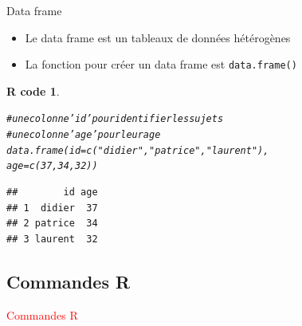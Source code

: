 \documentclass[11pt]{beamer}\usepackage[]{graphicx}\usepackage[]{color}
\makeatletter
\newcommand{\hlnum}[1]{\textcolor[rgb]{0.063,0.58,0.627}{#1}}%
\newcommand{\hlstr}[1]{\textcolor[rgb]{0.063,0.58,0.627}{#1}}%
\newcommand{\hlcom}[1]{\textcolor[rgb]{0.588,0.588,0.588}{#1}}%
\newcommand{\hlstd}[1]{\textcolor[rgb]{0.196,0.196,0.196}{#1}}%
\newcommand{\hlkwc}[1]{\textcolor[rgb]{0,0.631,0.314}{#1}}%
\newcommand{\hlkwd}[1]{\textcolor[rgb]{0.78,0.227,0.412}{#1}}%
\newenvironment{kframe}{%
 \def\at@end@of@kframe{}%
 \ifinner\ifhmode%
  \def\at@end@of@kframe{\end{minipage}}%
  \begin{minipage}{\columnwidth}%
 \fi\fi%
 \def\FrameCommand##1{\hskip\@totalleftmargin \hskip-\fboxsep
 \colorbox{shadecolor}{##1}\hskip-\fboxsep
     \hskip-\linewidth \hskip-\@totalleftmargin \hskip\columnwidth}%
 \MakeFramed {\advance\hsize-\width
   \@totalleftmargin\z@ \linewidth\hsize
   \@setminipage}}%
 {\par\unskip\endMakeFramed%
 \at@end@of@kframe}
\newenvironment{knitrout}{}{} %
\newtheorem{rcode}{R code}[section]
\newcommand{\code}[1]{\texttt{#1}}
\makeatother
\begin{document}
\begin{frame}[fragile]{Data frame}

\begin{itemize}
  \setlength\itemsep{0.5em}
\item Le data frame est un tableaux de données hétérogènes
\pause \item La fonction pour créer un data frame est \code{data.frame()}
\end{itemize}
\pause
\begin{knitrout}
\color{fgcolor}\begin{kframe}
\begin{rcode}\label{unnamed-chunk-21}\begin{alltt}
\hlcom{# une colonne 'id' pour identifier les sujets}
\hlcom{# une colonne 'age' pour leur age}
\hlkwd{data.frame}\hlstd{(}\hlkwc{id} \hlstd{=} \hlkwd{c}\hlstd{(}\hlstr{"didier"}\hlstd{,}\hlstr{"patrice"}\hlstd{,}\hlstr{"laurent"}\hlstd{),}
           \hlkwc{age} \hlstd{=} \hlkwd{c}\hlstd{(}\hlnum{37}\hlstd{,}\hlnum{34}\hlstd{,}\hlnum{32}\hlstd{))}
\end{alltt}
\begin{verbatim}
##        id age
## 1  didier  37
## 2 patrice  34
## 3 laurent  32
\end{verbatim}
\end{rcode}\end{kframe}
\end{knitrout}

\end{frame}




\subsection{Commandes R}

\begin{frame}
 \begin{center}
  \Huge{\textcolor{red}{Commandes R}}
 \end{center}
\end{frame}
\end{document}
